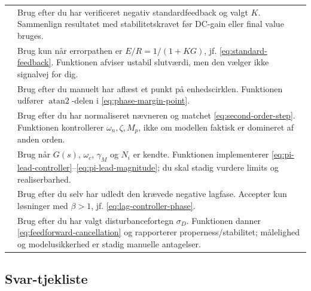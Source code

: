 \begin{tabularx}{\textwidth}{@{}p{}Y@{}}
 & Brug efter du har verificeret negativ standardfeedback og valgt \(K\). Sammenlign resultatet med stabilitetskravet før DC-gain eller final value bruges.\\
 & Brug kun når errorpathen er \(E/R=1/(1+KG)\), jf. \eqref{eq:standard-feedback}. Funktionen afviser ustabil slutværdi, men den vælger ikke signalvej for dig.\\
 & Brug efter du manuelt har aflæst et punkt på enhedscirklen. Funktionen udfører \(\operatorname{atan2}\)-delen i \eqref{eq:phase-margin-point}.\\
 & Brug efter du har normaliseret nævneren og matchet \eqref{eq:second-order-step}. Funktionen kontrollerer \(\omega_n,\zeta,M_p\), ikke om modellen faktisk er domineret af anden orden.\\
 & Brug når \(G(s)\), \(\omega_c\), \(\gamma_M\) og \(N_i\) er kendte. Funktionen implementerer \eqref{eq:pi-lead-controller}--\eqref{eq:pi-lead-magnitude}; du skal stadig vurdere limits og realiserbarhed.\\
 & Brug efter du selv har udledt den krævede negative lagfase. Accepter kun løsninger med \(\beta>1\), jf. \eqref{eq:lag-controller-phase}.\\
 & Brug efter du har valgt disturbancefortegn \(\sigma_D\). Funktionen danner \eqref{eq:feedforward-cancellation} og rapporterer properness/stabilitet; målelighed og modelusikkerhed er stadig manuelle antagelser.\\
\bottomrule
\end{tabularx}

\subsection{Svar-tjekliste}

